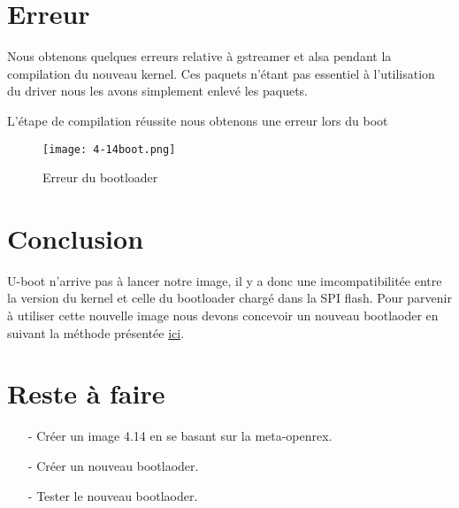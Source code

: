 \section{Erreur}
Nous obtenons quelques erreurs relative à gstreamer et alsa pendant la compilation du nouveau kernel.
Ces paquets n'étant pas essentiel à l'utilisation du driver nous les avons simplement enlevé les paquets.

L'étape de compilation réussite nous obtenons une erreur lors du boot
\begin{figure}[th]
  \centering
  \texttt{[image: 4-14boot.png]}
  \decoRule
  \caption{Erreur du bootloader}  \label{fig:planning}
\end{figure}

\section{Conclusion}

U-boot n'arrive pas à lancer notre image, il y a donc une imcompatibilitée entre 
la version du kernel et celle du bootloader chargé dans la SPI flash. Pour parvenir
à utiliser cette nouvelle image nous devons concevoir un nouveau bootlaoder en suivant
la méthode présentée
\href{http://www.imx6rex.com/open-rex/software/yocto-uboot-how-to-add-support-for-a-custom-board/}
{ici}.
 
\section{Reste à faire}
\begin{itemize}
\item[-] Créer un image 4.14 en se basant sur la meta-openrex.
\item[-] Créer un nouveau bootlaoder.
\item[-] Tester le nouveau bootlaoder.
\end{itemize}

